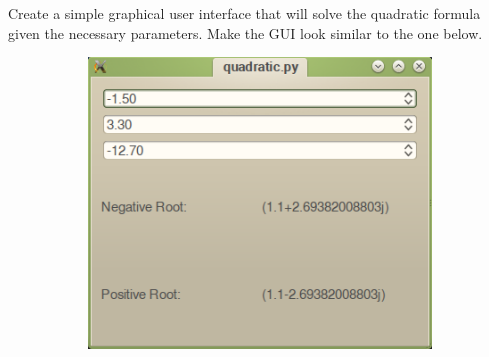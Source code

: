 \begin{problem}
Create a simple graphical user interface that will solve the quadratic formula given the necessary parameters.
Make the GUI look similar to the one below.
\begin{figure}[H]
\centering

\begin{subfigure}[b]{.49\textwidth}
\includegraphics[width=\textwidth]{quadratic_view2.png}

\end{subfigure}
\end{figure}
\end{problem}
